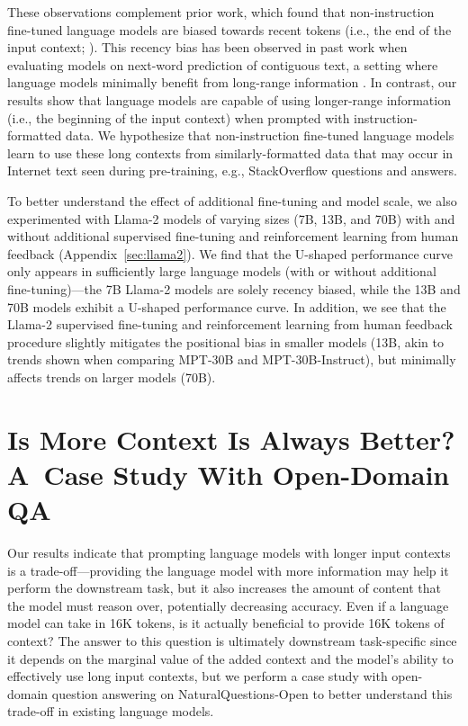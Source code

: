 \documentclass[11pt,a4paper]{article}
\newcommand{\mptinstruct}[0]{MPT-30B-Instruct\xspace}
\newcommand{\mpt}[0]{MPT-30B\xspace}
\begin{document}
These observations complement prior work, which found that non-instruction fine-tuned language models are biased towards recent tokens (i.e., the end of the input context; \citealp{khandelwal-etal-2018-sharp,press-etal-2021-shortformer}).
This recency bias has been observed in past work when evaluating models on next-word prediction of contiguous text, a setting where language models minimally benefit from long-range information \citep{sun-etal-2021-long}.
In contrast, our results show that language models are capable of using longer-range information (i.e., the beginning of the input context) when prompted with instruction-formatted data. We hypothesize that non-instruction fine-tuned language models learn to use these long contexts from similarly-formatted data that may occur in Internet text seen during pre-training, e.g., StackOverflow questions and answers.

To better understand the effect of additional fine-tuning and model scale, we also experimented with Llama-2 models of varying sizes (7B, 13B, and 70B) with and without additional supervised fine-tuning and reinforcement learning from human feedback (Appendix~\ref{sec:llama2}). We find that the U-shaped performance curve only appears in sufficiently large language models (with or without additional fine-tuning)---the 7B Llama-2 models are solely recency biased, while the 13B and 70B models exhibit a U-shaped performance curve. In addition, we see that the Llama-2 supervised fine-tuning and reinforcement learning from human feedback procedure slightly mitigates the positional bias in smaller models (13B, akin to trends shown when comparing \mpt and \mptinstruct), but minimally affects trends on larger models (70B).

\section{Is More Context Is Always Better? A~Case Study With Open-Domain QA}\label{sec:odqa_case_study}

Our results indicate that prompting language models with longer input contexts is a trade-off---providing the language model with more information may help it perform the downstream task, but it also increases the amount of content that the model must reason over, potentially decreasing accuracy. Even if a language model can take in 16K tokens, is it actually beneficial to provide 16K tokens of context? The answer to this question is ultimately downstream task-specific since it depends on the marginal value of the added context and the model's ability to effectively use long input contexts, but we perform a case study with open-domain question answering on NaturalQuestions-Open to better understand this trade-off in existing language models.
\end{document}
